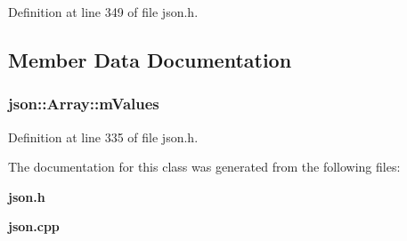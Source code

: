 Definition at line 349 of file json.\+h.



\subsection{Member Data Documentation}
\subsubsection[{m\+Values}]{ json\+::\+Array\+::m\+Values\hspace{0.3cm}{\ttfamily [protected]}}\label{classjson_1_1_array_a6c2619851ee6b74a0ca4d1d8dc49f7cd}


Definition at line 335 of file json.\+h.



The documentation for this class was generated from the following files\+:\begin{DoxyCompactItemize}
\item 
{\bf json.\+h}\item 
{\bf json.\+cpp}\end{DoxyCompactItemize}
